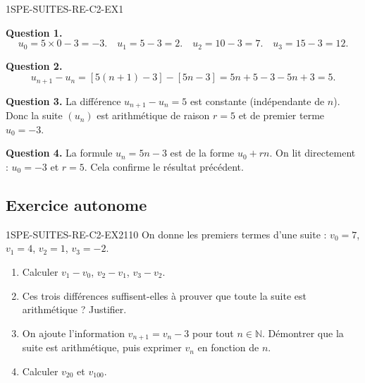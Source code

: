 
\begin{corrige}{1SPE-SUITES-RE-C2-EX1}

\textbf{Question 1.}
\[
u_0 = 5 \times 0 - 3 = -3. \quad u_1 = 5 - 3 = 2. \quad u_2 = 10 - 3 = 7. \quad u_3 = 15 - 3 = 12.
\]


\textbf{Question 2.}
\[
u_{n+1} - u_n = [5(n+1) - 3] - [5n - 3] = 5n + 5 - 3 - 5n + 3 = 5.
\]


\textbf{Question 3.} La différence $u_{n+1} - u_n = 5$ est constante (indépendante de $n$). Donc la suite $(u_n)$ est arithmétique de raison $r = 5$ et de premier terme $u_0 = -3$.


\textbf{Question 4.} La formule $u_n = 5n - 3$ est de la forme $u_0 + rn$. On lit directement : $u_0 = -3$ et $r = 5$. Cela confirme le résultat précédent.

\end{corrige}

\subsection*{Exercice autonome}


\begin{exercice}{1SPE-SUITES-RE-C2-EX2}{1}{10}
On donne les premiers termes d'une suite : $v_0 = 7$, $v_1 = 4$, $v_2 = 1$, $v_3 = -2$.
\begin{enumerate}
  \item Calculer $v_1 - v_0$, $v_2 - v_1$, $v_3 - v_2$.
  \item Ces trois différences suffisent-elles à prouver que toute la suite est
  arithmétique ? Justifier.
  \item On ajoute l'information $v_{n+1}=v_n-3$ pour tout
  $n\in\mathbb{N}$. Démontrer que la suite est arithmétique, puis exprimer
  $v_n$ en fonction de $n$.
  \item Calculer $v_{20}$ et $v_{100}$.
\end{enumerate}
\end{exercice}

